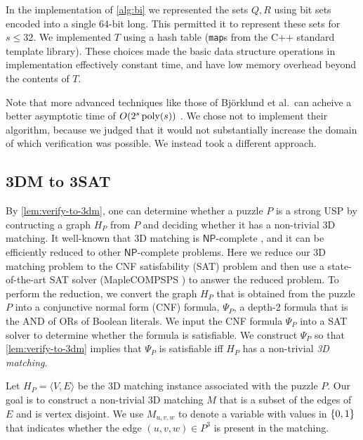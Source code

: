 \documentclass[11pt]{article}
\renewcommand\NP{\ensuremath{\mathsf{NP}}}
\begin{document}
In the implementation of \autoref{alg:bi} we represented the sets
$Q,R$ using bit sets encoded into a single 64-bit long.  This
permitted it to represent these sets for $s \le 32$.  We implemented
$T$ using a hash table (\texttt{map}s from the C++ standard template library).
These choices made the basic data structure operations in
implementation effectively constant time, and have low memory overhead
beyond the contents of $T$.

Note that more advanced techniques like those of Bj\"{o}rklund et
al.~can acheive a better asymptotic time of $O(2^s\operatorname{poly}(s))$
\cite{b2010}.  We chose not to implement their algorithm, because we
judged that it would not substantially increase the domain of which
verification was possible.  We instead took a different approach.

\newpage
\subsection{3DM to 3SAT}
\label{subsec:sat}

By \autoref{lem:verify-to-3dm}, one can
determine whether a puzzle $P$ is a strong USP by contructing a
graph $H_P$ from $P$ and deciding whether it has a non-trivial 3D matching.  It well-known that 3D matching is \NP{}-complete \cite{XXX}, and it can be efficiently reduced to
other \NP{}-complete problems. Here we reduce our 3D
matching problem to the
CNF satisfability (SAT) problem and then use a state-of-the-art
SAT solver (MapleCOMPSPS \cite{XXX}) to answer the reduced problem. To perform the
reduction, we convert the graph $H_P$ that is obtained from the
puzzle $P$ into a conjunctive normal form (CNF) formula, $\Psi_P$, a depth-2 formula that is the AND of ORs of Boolean literals.  We input the CNF
formula $\Psi_P$ into a SAT solver to determine whether the formula is
satisfiable.  We construct $\Psi_P$ so that \autoref{lem:verify-to-3dm} implies that $\Psi_P$
is satisfiable iff $H_P$ has a non-trivial \emph{3D matching}.

Let $H_P = \langle V, E \rangle$ be the 3D matching instance
associated with the puzzle $P$.  Our goal is to construct a
non-trivial 3D matching $M$ that is a subset of the edges of $E$ and
is vertex disjoint.  We use $M_{u,v,w}$ to denote a variable with
values in $\left\{ 0,1 \right\}$ that indicates whether the edge $(u,v,w) \in P^3$
is present in the matching.
\end{document}
